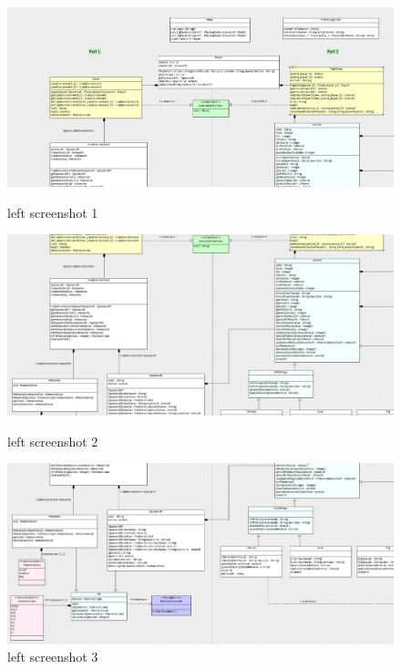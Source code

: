 \begin{figure}
  \includegraphics[width=460pt]{../../Images/1_1-2_1.png}
  \caption{\small left screenshot 1}
  \includegraphics[width=460pt]{../../Images/1_1-1_2-2_2.png}
  \caption{\small left screenshot 2}
  \includegraphics[width=460pt]{../../Images/1_2-2_3.png}
  \caption{\small left screenshot 3}
\end{figure}

